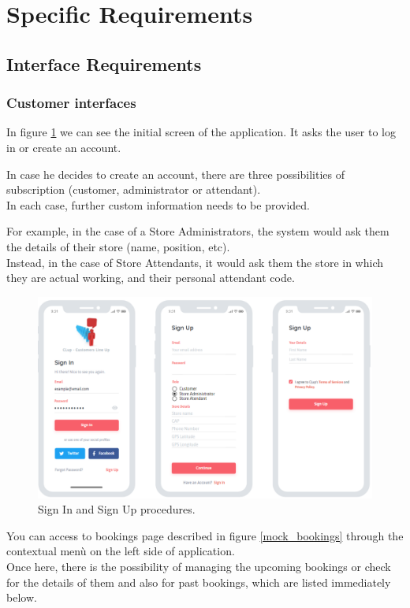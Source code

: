 \documentclass[table, 12pt]{article}
\begin{document}
\newpage
\section{Specific Requirements}
\subsection{Interface Requirements}
\subsubsection{Customer interfaces}
In figure \ref{mock_sign_in_up} we can see the initial screen of the application.
It asks the user to log in or create an account.

In case he decides to create an account, there are three possibilities of subscription (customer, administrator or attendant).\\
In each case, further custom information needs to be provided.

For example, in the case of a Store Administrators, the system would ask them the details of their store (name, position, etc).\\
Instead, in the case of Store Attendants, it would ask them the store in which they are actual working, and their personal attendant code.
\begin{figure}[H]
    \begin{center}
        \includegraphics[width=\textwidth]{assets/Mockups/mock_sign_in_sign_up.png}
        \caption{Sign In and Sign Up procedures.}
        \label{mock_sign_in_up}
    \end{center}
\end{figure}

You can access to bookings page described in figure \ref{mock_bookings} through the contextual menù on the left side of application.\\
Once here, there is the possibility of managing the upcoming bookings or check for the details of them and also for past bookings, which are listed immediately below.
\end{document}
